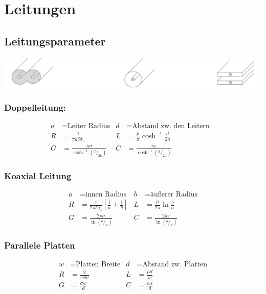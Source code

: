 \section{Leitungen}

\subsection{Leitungsparameter}

\includegraphics[width=\columnwidth]{Figures/Leitungsparameter.png}

\subsubsection{Doppelleitung:}
\begin{align*}
    a & = \text{Leiter Radius}                   & d & = \text{Abstand zw. den Leitern}                \\
    R & = \frac{1}{\pi a\delta\sigma_c}          & L & = \frac{\mu}{\pi} \cosh^{-1}\frac{d}{2a}      & \\
    G & = \frac{\pi\sigma}{\cosh^{-1}(^d/_{2a})} & C & = \frac{\pi\varepsilon}{\cosh^{-1}(^d/_{2a})}
\end{align*}

\subsubsection{Koaxial Leitung}
\begin{align*}
    a & = \text{innen Radius}                                              & b & = \text{äußerer Radius}               \\
    R & = \frac{1}{2\pi\delta\sigma_c}\left[\frac{1}{a}+\frac{1}{b}\right] & L & = \frac{\mu}{2\pi} \ln\frac{b}{a}     \\
    G & = \frac{2\pi\sigma}{\ln (^b/_a)}                                   & C & = \frac{2\pi\varepsilon}{\ln (^b/_a)}
\end{align*}

\subsubsection{Parallele Platten}
\begin{align*}
    w & = \text{Platten Breite}   & d & = \text{Abstand zw. Platten} \\
    R & = \frac{2}{w\delta\sigma} & L & = \frac{\mu d}{w}            \\
    G & = \frac{\sigma w}{d}      & C & = \frac{w\varepsilon}{d}
\end{align*}

